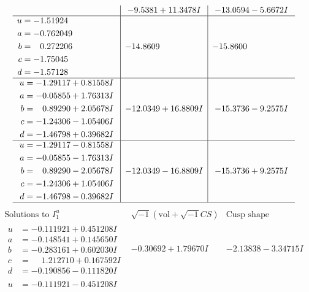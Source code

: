 \documentclass[1p]{elsarticle_modified}
\theoremstyle{definition}
\newcommand{\I}{\sqrt{-1}}
\begin{document}
$$\begin{array}{c|c|c}
 & -9.5381 + 11.3478 I & -13.0594 - 5.6672 I \\ \hline\begin{aligned}
u &= -1.51924\phantom{ +0.000000I} \\
a &= -0.762049\phantom{ +0.000000I} \\
b &= \phantom{-}0.272206\phantom{ +0.000000I} \\
c &= -1.75045\phantom{ +0.000000I} \\
d &= -1.57128\phantom{ +0.000000I}\end{aligned}
 & -14.8609\phantom{ +0.000000I} & -15.8600\phantom{ +0.000000I} \\ \hline\begin{aligned}
u &= -1.29117 + 0.81558 I \\
a &= -0.05855 + 1.76313 I \\
b &= \phantom{-}0.89290 + 2.05678 I \\
c &= -1.24306 - 1.05406 I \\
d &= -1.46798 + 0.39682 I\end{aligned}
 & -12.0349 + 16.8809 I & -15.3736 - 9.2575 I \\ \hline\begin{aligned}
u &= -1.29117 - 0.81558 I \\
a &= -0.05855 - 1.76313 I \\
b &= \phantom{-}0.89290 - 2.05678 I \\
c &= -1.24306 + 1.05406 I \\
d &= -1.46798 - 0.39682 I\end{aligned}
 & -12.0349 - 16.8809 I & -15.3736 + 9.2575 I\\
 \hline 
 \end{array}$$\newpage$$\begin{array}{c|c|c}  
\text{Solutions to }I^u_{1}& \I (\text{vol} + \sqrt{-1}CS) & \text{Cusp shape}\\
 \hline 
\begin{aligned}
u &= -0.111921 + 0.451208 I \\
a &= -0.148541 + 0.145650 I \\
b &= -0.283161 + 0.602030 I \\
c &= \phantom{-}1.212710 + 0.167592 I \\
d &= -0.190856 - 0.111820 I\end{aligned}
 & -0.30692 + 1.79670 I & -2.13838 - 3.34715 I \\ \hline\begin{aligned}
u &= -0.111921 - 0.451208 I \\

\end{aligned}
\end{array}$$
\end{document}
